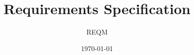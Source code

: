 \documentclass{report}
\begin{document}
\thispagestyle{empty}

\title{Requirements Specification}
\author{REQM}
\date{\today}
\maketitle
\newpage

\tableofcontents
\listoffigures
\listoftables
\newpage




\appendix

\end{document}
